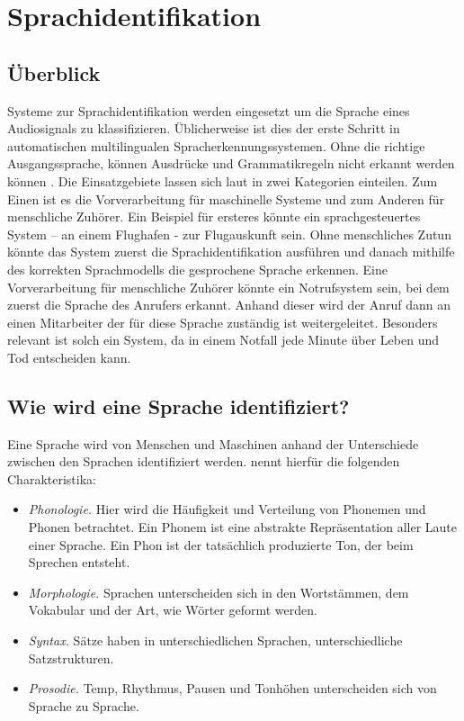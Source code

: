 \section{Sprachidentifikation}
\subsection{Überblick}
Systeme zur Sprachidentifikation werden eingesetzt um die Sprache eines Audiosignals zu klassifizieren. Üblicherweise ist dies der erste Schritt in automatischen multilingualen Spracherkennungssystemen.
Ohne die richtige Ausgangssprache, können Ausdrücke und Grammatikregeln nicht erkannt werden können \cite{Bartz.2017}.
Die Einsatzgebiete lassen sich laut \cite{Zissman.2001} in zwei Kategorien einteilen. Zum Einen ist es die Vorverarbeitung für maschinelle Systeme und zum Anderen für menschliche Zuhörer. Ein Beispiel für ersteres könnte ein sprachgesteuertes System – an einem Flughafen - zur Flugauskunft sein. Ohne menschliches Zutun könnte das System zuerst die Sprachidentifikation ausführen und danach mithilfe des korrekten Sprachmodells die gesprochene Sprache erkennen.
Eine Vorverarbeitung für menschliche Zuhörer könnte ein Notrufsystem sein, bei dem zuerst die Sprache des Anrufers erkannt. Anhand dieser wird der Anruf dann an einen Mitarbeiter der für diese Sprache zuständig ist weitergeleitet. Besonders relevant ist solch ein System, da in einem Notfall jede Minute über Leben und Tod entscheiden kann.

\subsection{Wie wird eine Sprache identifiziert?}
Eine Sprache wird von Menschen und Maschinen anhand der Unterschiede zwischen den Sprachen identifiziert werden. \cite{Zissman.2001} nennt hierfür die folgenden Charakteristika:
\begin{itemize}
\item \textit{Phonologie.} Hier wird die Häufigkeit und Verteilung von Phonemen und Phonen betrachtet. Ein Phonem ist eine abstrakte Repräsentation aller Laute einer Sprache. Ein Phon ist der tatsächlich produzierte Ton, der beim Sprechen entsteht.
\item \textit{Morphologie.} Sprachen unterscheiden sich in den Wortstämmen, dem Vokabular und der Art, wie Wörter geformt werden.
\item \textit{Syntax.} Sätze haben in unterschiedlichen Sprachen, unterschiedliche Satzstrukturen.
\item \textit{Prosodie.} Temp, Rhythmus, Pausen und Tonhöhen unterscheiden sich von Sprache zu Sprache.
\end{itemize}

